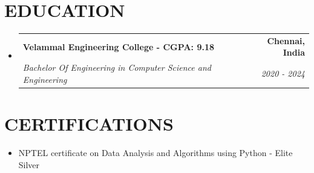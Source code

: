 \documentclass[letterpaper,11pt]{article}
\makeatletter
\newcommand{\resumeItem}[1]{%
  \item\small{%
    {#1\vspace{-2pt}}%
  }%
}
\newcommand{\resumeSubheading}[4]{
  \vspace{-2pt}\item
    \begin{tabular*}{1.0\textwidth}[t]{l@{\extracolsep{\fill}}r}
      \textbf{\large#1} & \textbf{\small #2} \\
      \textit{\large#3} & \textit{\small #4} \\
      
    \end{tabular*}\vspace{-9pt}
}
\newcommand{\resumeSubHeadingListStart}{\begin{itemize}[leftmargin=0.0in, label={}]}
\newcommand{\resumeSubHeadingListEnd}{\end{itemize}}
\newcommand{\resumeItemListStart}{\begin{itemize}[leftmargin=0.1in]}
\newcommand{\resumeItemListEnd}{\end{itemize}\vspace{-6pt}}
\makeatother
\begin{document}
\section{\color{airforceblue}EDUCATION}
  \resumeSubHeadingListStart
    \resumeSubheading
      {Velammal Engineering College \textnormal{\small - CGPA: 9.18}}{Chennai, India}
      {Bachelor Of Engineering in Computer Science and Engineering}{2020 - 2024}
    \vspace{-4pt}
  \resumeSubHeadingListEnd
  \vspace{-10pt}

\section{\color{airforceblue}CERTIFICATIONS}
    
  \resumeItemListStart
    \resumeItem{\normalsize{ NPTEL certificate on Data Analysis and Algorithms using Python - Elite Silver}}
    \vspace{-5pt}

    
  \resumeItemListEnd 
      
\vspace{-8pt}

      
\vspace{-14pt}
\end{document}
